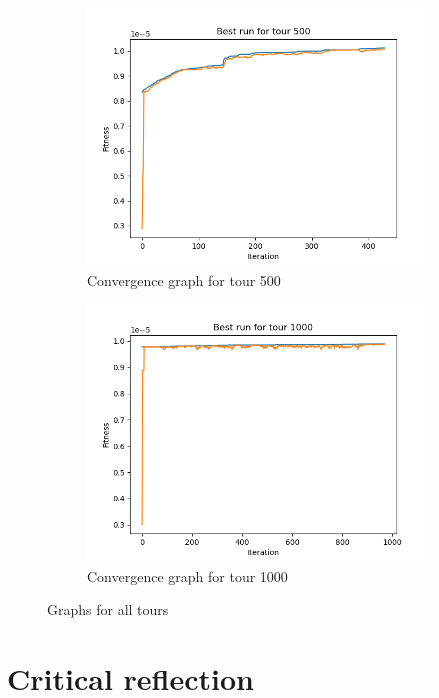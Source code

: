 \documentclass[a4paper,10pt]{article}
\begin{document}
\begin{figure}
\begin{subfigure}[b]{0.49\textwidth}
         \includegraphics[width=\textwidth]{plots/plot_500}
			\caption{Convergence graph for tour 500}
			\label{fig:cg500}
     \end{subfigure}
      \begin{subfigure}[b]{0.49\textwidth}
         \centering
         \includegraphics[width=\textwidth]{plots/plot_1000}
         \caption{Convergence graph for tour 1000}
         \label{fig:cg1000}
     \end{subfigure}
        \caption{Graphs for all tours}
        \label{fig:graphs}
\end{figure}

\clearpage

\section{Critical reflection}
\end{document}
